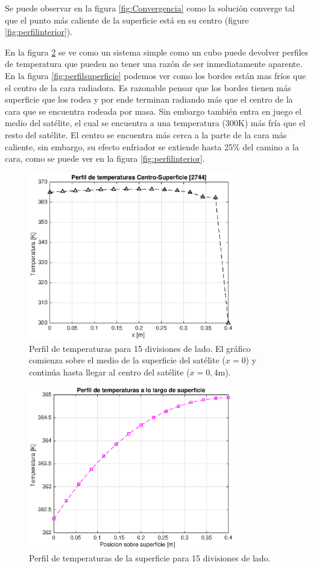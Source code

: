 \documentclass[onecolumn,10pt,titlepage,a4paper]{article}
\begin{document}
Se puede observar en la figura \ref{fig:Convergencia} como la solución converge tal que el punto más caliente de la superficie está en su centro (figure \ref{fig:perfilinterior}). 

En la figura \ref{fig:perfilsurf15} se ve como un sistema simple como un cubo puede devolver perfiles de temperatura que pueden no tener una razón de ser inmediatamente aparente. En la figura \ref{fig:perfilsuperficie} podemos ver como los bordes están mas fríos que el centro de la cara radiadora. Es razonable pensar que los bordes tienen más superficie que los rodea y por ende terminan radiando más que el centro de la cara que se encuentra rodeada por masa. Sin embargo también entra en juego el medio del satélite, el cual se encuentra a una temperatura (300K) más fría que el resto del satélite. El centro se encuentra más cerca a la parte de la cara más caliente, sin embargo, su efecto enfriador se extiende hasta 25\% del camino a la cara, como se puede ver en la figura \ref{fig:perfilinterior}. 
\begin{figure}[htb!]
	\centering
	\includegraphics[width=0.8\textwidth]{fig/perfil13.eps}
	\caption{Perfil de temperaturas para 15 divisiones de lado. El gráfico comienza sobre el medio de la superficie del satélite ($x=0$) y continúa hasta llegar al centro del satélite ($x=0,4$m).  }
	\label{fig:perfil15}
\end{figure}
\begin{figure}[htb!]
	\centering
	\includegraphics[width=0.8\textwidth]{fig/perfilsurf15.eps}
	\caption{Perfil de temperaturas de la superficie para 15 divisiones de lado. }
	\label{fig:perfilsurf15}
\end{figure}
\end{document}
